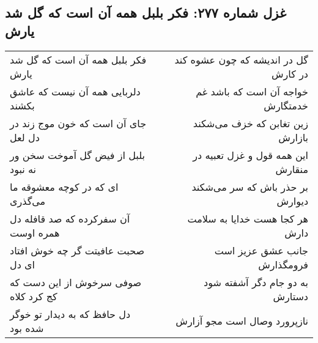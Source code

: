 \begin{center}
\section*{غزل شماره ۲۷۷: فکر بلبل همه آن است که گل شد یارش}
\label{sec:sh277}
\begin{longtable}{l p{0.5cm} r}
فکر بلبل همه آن است که گل شد یارش
&&
گل در اندیشه که چون عشوه کند در کارش
\\
دلربایی همه آن نیست که عاشق بکشند
&&
خواجه آن است که باشد غم خدمتگارش
\\
جای آن است که خون موج زند در دل لعل
&&
زین تغابن که خزف می‌شکند بازارش
\\
بلبل از فیض گل آموخت سخن ور نه نبود
&&
این همه قول و غزل تعبیه در منقارش
\\
ای که در کوچه معشوقه ما می‌گذری
&&
بر حذر باش که سر می‌شکند دیوارش
\\
آن سفرکرده که صد قافله دل همره اوست
&&
هر کجا هست خدایا به سلامت دارش
\\
صحبت عافیتت گر چه خوش افتاد ای دل
&&
جانب عشق عزیز است فرومگذارش
\\
صوفی سرخوش از این دست که کج کرد کلاه
&&
به دو جام دگر آشفته شود دستارش
\\
دل حافظ که به دیدار تو خوگر شده بود
&&
نازپرورد وصال است مجو آزارش
\\
\end{longtable}
\end{center}
